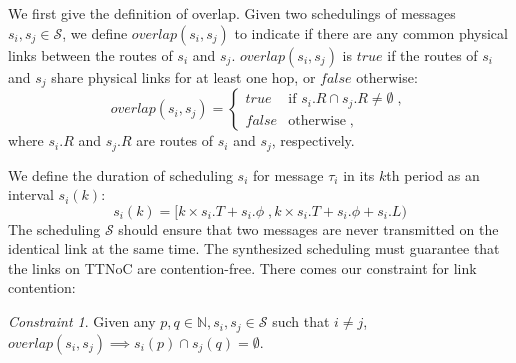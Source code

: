 \documentclass[10pt,journal]{IEEEtran}
\newcommand{\calS}{\mathcal{S}}
\theoremstyle{remark}
\newtheorem{constraint}{Constraint}
\begin{document}
We first give the definition of overlap.
Given two schedulings of messages $s_i,s_j\in\calS$, %
 we define $overlap(s_i,s_j)$ to indicate if there are any common physical links between the routes of $s_i$ and $s_j$.
$overlap(s_i,s_j)$ is $true$ if the routes of $s_i$ and $s_j$ share
physical links for at least one hop, or $false$ otherwise:
\begin{equation}
\label{e:overlap}
overlap(s_i,s_j)= 
\begin{cases}
  true &\mbox{if } s_i.R \cap s_j.R \neq \emptyset \; ,\\
  false & \mbox{otherwise}\; ,
\end{cases}
\end{equation}
where $s_i.R$ and $s_j.R$ are routes of $s_i$ and $s_j$, respectively.

We define the duration of scheduling $s_i$ for message $\tau_i$ in its $k$th
period as an interval $s_i(k)$:
\begin{equation}
\label{e:duration}
s_i(k) = [k\times s_i.T+s_i.\phi \; , k\times s_i.T+s_i.\phi+s_i.L)
\end{equation}  
The scheduling $\calS$ should ensure that two messages are never transmitted on the identical link at the same
time. 
The synthesized scheduling must guarantee that the links on TTNoC are contention-free.
There comes our constraint for link contention:
\begin{constraint}
\label{c:link}
  Given any $p,q\in\mathbb{N}, s_i,s_j \in \calS$ such that $i\neq j$, 
  $overlap(s_i,s_j) \implies s_i(p) \cap s_j(q) = \emptyset$.


  
\end{constraint}
\end{document}
